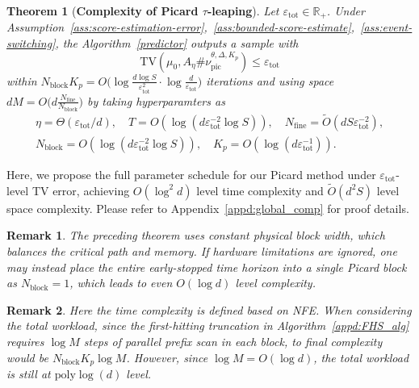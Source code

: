 \documentclass{article}
\newtheorem{theorem}{Theorem}[section]
\newtheorem{remark}{Remark}[section]
\begin{document}
\begin{theorem}[\bf Complexity of Picard $\tau$-leaping]
\label{thm:global-complexity-liang_main}
Let $\varepsilon_{\mathrm{tot}}\in \mathbb{R}_+$. Under Assumption~\ref{ass:score-estimation-error},~\ref{ass:bounded-score-estimate},~\ref{ass:event-switching}, 
the Algorithm~\ref{predictor} outputs a sample with 
\[\mathrm{TV}(\mu_0,A_\eta\#\nu_{\mathrm{pic}}^{\theta,\Delta,K_p}) \leq \varepsilon_{\mathrm{tot}}\]
within $N_{\mathrm{block}}K_p
=
O\Big(
\log\frac{d \log S}{\varepsilon_{\mathrm{tot}}^2}
\cdot
\log\frac{d}{\varepsilon_{\mathrm{tot}}}
\Big)$ iterations and using space $dM=O\Big(d\frac{N_{\mathrm{fine}}}{N_{\mathrm{block}}}\Big)$
by taking hyperparamters as 
\begin{gather*}
\eta=\Theta(\varepsilon_{\mathrm{tot}}/d),
\quad
T=O\left(\log (d\varepsilon_{\mathrm{tot}}^{-2}\log S )\right),
\quad
N_{\mathrm{fine}}=\widetilde O\left(dS{\varepsilon_{\mathrm{tot}}^{-2}}\right),
\\
N_{\mathrm{block}}
=
O\left(\log (d\varepsilon_{\mathrm{tot}}^{-2}\log S )\right),
\quad
K_p
=
O\left(\log (d\varepsilon_{\mathrm{tot}}^{-1})\right).
\end{gather*}

\end{theorem}
Here, we propose the full parameter schedule for our Picard method under $\varepsilon_{\mathrm{tot}}$-level TV error, achieving ${O}(\log^2d)$ level time complexity and $\widetilde O\left({d^2S}\right)$ level space complexity. Please refer to Appendix~\ref{appd:global_comp} for proof details.  
\begin{remark}
The preceding theorem uses constant physical block width, which balances the critical path and memory.  If hardware limitations are ignored, one may instead place the entire early-stopped time horizon into a single Picard block as $N_{\mathrm{block}}=1$, which leads to even $O(\log d)$ level complexity.
\end{remark}
\begin{remark}
Here the time complexity is defined based on NFE. When considering the total workload, since the first-hitting truncation in Algorithm~\ref{appd:FHS_alg} requires $\log M$ steps of parallel prefix scan in each block, to final complexity would be $N_{\mathrm{block}}K_p\log M$. However, since $\log M=O(\log d)$, the total workload is still at $\mathrm{poly}\log(d)$ level.
\end{remark}
\end{document}
